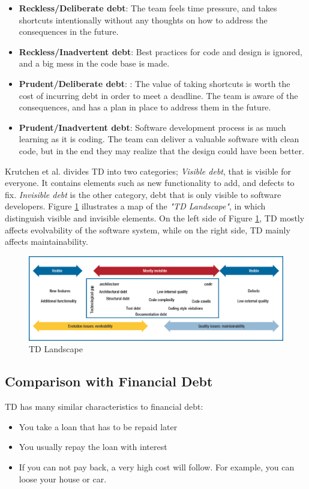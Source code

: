 \begin{itemize}
	\item \textbf{Reckless/Deliberate debt}: The team feels time pressure, and takes shortcuts intentionally without any thoughts on how to address the consequences in the future.
	\item \textbf{Reckless/Inadvertent debt}: Best practices for code and design is ignored, and a big mess in the code base is made.
	\item \textbf{Prudent/Deliberate debt}: : The value of taking shortcuts is worth the cost of incurring debt in order to meet a deadline. The team is aware of the consequences, and has a plan in place to address them in the future. 
	\item \textbf{Prudent/Inadvertent debt}: Software development process is as much learning as it is coding. The team can deliver a valuable software with clean code, but in the end they may realize that the design could have been better.
\end{itemize}

Krutchen et al.\cite{krutchen} divides TD into two categories; \textit{Visible debt}, that is visible for everyone. It contains elements such as new functionality to add, and defects to fix. \textit{Invisible debt} is the other category, debt that is only visible to software developers. Figure \ref{fig:techDebtLandscape} illustrates a map of the \textit{"TD Landscape"}, in which distinguish visible and invisible elements. On the left side of Figure \ref{fig:techDebtLandscape}, TD mostly affects evolvability of the software system, while on the right side, TD mainly affects maintainability.

\begin{figure}[ht!]
	\centering
	\includegraphics[width=1.0\textwidth]{images/techDebtLandscape.png}
	\caption{TD Landscape}
	\label{fig:techDebtLandscape}
\end{figure}

\subsection{Comparison with Financial Debt}
TD has many similar characteristics to financial debt\cite{p50-allman,Zazworka:2011:PDD:1985362.1985372}:
\begin{itemize}
	\item You take a loan that has to be repaid later
	\item You usually repay the loan with interest
	\item If you can not pay back, a very high cost will follow. For example, you can loose your house or car.
\end{itemize}

